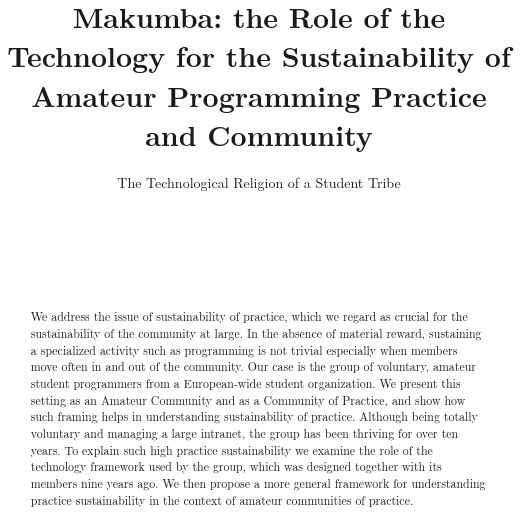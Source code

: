 \documentclass{acm_proc_article-sp}
\begin{document}
\title{Makumba: the Role of the Technology for the Sustainability of Amateur Programming Practice and Community}
\subtitle{The Technological Religion of a Student Tribe}


\author{
\alignauthor
\hspace{10mm} \\
       \affaddr{\hspace{10mm} }\\
       \affaddr{\hspace{10mm} }\\
       \affaddr{\hspace{10mm} }\\
       \email{\hspace{10mm} }
}

\maketitle
\begin{abstract}
We address the issue of sustainability of practice, which we regard as crucial for the sustainability of the community at large. In the absence of material reward, sustaining a specialized activity such as programming is not trivial especially when members move often in and out of the community. Our case is the group of voluntary, amateur student programmers from a European-wide student organization. We present this setting as an Amateur Community and as a Community of Practice, and show how such framing helps in understanding sustainability of practice. Although being totally voluntary and managing a large intranet, the group has been thriving for over ten years. To explain such high practice sustainability we examine the role of the technology framework used by the group, which was designed together with its members nine years ago. We then propose a more general framework for understanding practice sustainability in the context of amateur communities of practice. 
\end{abstract}
\end{document}
